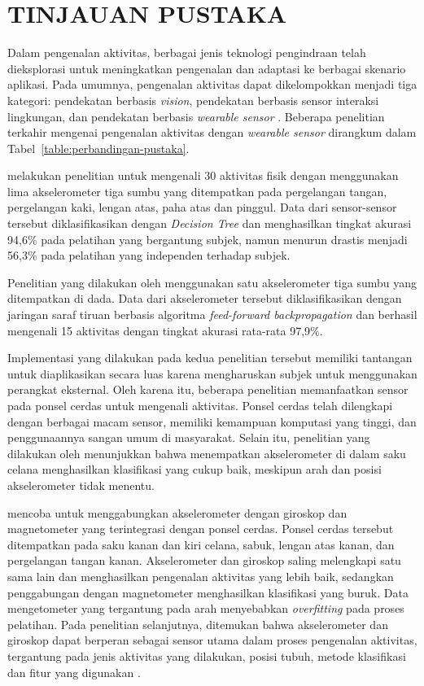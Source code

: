 \chapter{TINJAUAN PUSTAKA}

Dalam pengenalan aktivitas, berbagai jenis teknologi pengindraan telah dieksplorasi untuk meningkatkan pengenalan dan adaptasi ke berbagai skenario aplikasi. Pada umumnya, pengenalan aktivitas dapat dikelompokkan menjadi tiga kategori: pendekatan berbasis \textit{vision}, pendekatan berbasis sensor interaksi lingkungan, dan pendekatan berbasis \textit{wearable sensor} \Parencite{wang-2016}. Beberapa penelitian terkahir mengenai pengenalan aktivitas dengan \textit{wearable sensor} dirangkum dalam Tabel~\ref{table:perbandingan-pustaka}.

\Textcite{tapia-2007} melakukan penelitian untuk mengenali 30 aktivitas fisik dengan menggunakan lima akselerometer tiga sumbu yang ditempatkan pada pergelangan tangan, pergelangan kaki, lengan atas, paha atas dan pinggul. Data dari sensor-sensor tersebut diklasifikasikan dengan \textit{Decision Tree} dan menghasilkan tingkat akurasi 94,6\% pada pelatihan yang bergantung subjek, namun menurun drastis menjadi 56,3\% pada pelatihan yang independen terhadap subjek.

Penelitian yang dilakukan oleh \Textcite{khan-2010} menggunakan satu akselerometer tiga sumbu yang ditempatkan di dada. Data dari akselerometer tersebut diklasifikasikan dengan jaringan saraf tiruan berbasis algoritma \textit{feed-forward backpropagation} dan berhasil mengenali 15 aktivitas dengan tingkat akurasi rata-rata 97,9\%.

Implementasi yang dilakukan pada kedua penelitian tersebut memiliki tantangan untuk diaplikasikan secara luas karena mengharuskan subjek untuk menggunakan perangkat eksternal. Oleh karena itu, beberapa penelitian memanfaatkan sensor pada ponsel cerdas untuk mengenali aktivitas. Ponsel cerdas telah dilengkapi dengan berbagai macam sensor, memiliki kemampuan komputasi yang tinggi, dan penggunaannya sangan umum di masyarakat. Selain itu, penelitian yang dilakukan oleh \Textcite{he-2008} menunjukkan bahwa menempatkan akselerometer di dalam saku celana menghasilkan klasifikasi yang cukup baik, meskipun arah dan posisi akselerometer tidak menentu.

\Textcite{shoaib-2013} mencoba untuk menggabungkan akselerometer dengan giroskop dan magnetometer yang terintegrasi dengan ponsel cerdas. Ponsel cerdas tersebut ditempatkan pada saku kanan dan kiri celana, sabuk, lengan atas kanan, dan pergelangan tangan kanan. Akselerometer dan giroskop saling melengkapi satu sama lain dan menghasilkan pengenalan aktivitas yang lebih baik, sedangkan penggabungan dengan magnetometer menghasilkan klasifikasi yang buruk. Data mengetometer yang tergantung pada arah menyebabkan \textit{overfitting} pada proses pelatihan. Pada penelitian selanjutnya, ditemukan bahwa akselerometer dan giroskop dapat berperan sebagai sensor utama dalam proses pengenalan aktivitas, tergantung pada jenis aktivitas yang dilakukan, posisi tubuh, metode klasifikasi dan fitur yang digunakan \Parencite{shoaib-2014}.

